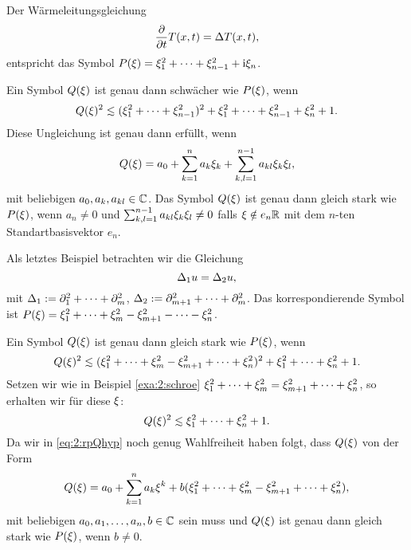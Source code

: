 \begin{exa}\label{exa:2:heat}
Der Wärmeleitungsgleichung
\begin{equation}
\frac{\partial}{\partial t}T(x,t)=\Delta T(x,t),
\end{equation}
entspricht das Symbol $P(\xi)=\xi^2_1+\dots+\xi^2_{n-1}+\mathrm i\xi_n$.

Ein Symbol $Q(\xi)$ ist genau dann schwächer wie $P(\xi)$, wenn
\begin{equation}
Q(\x)^2\apprle(\x^2_1+\dots+\x^2_{n-1})^2+\x^2_1+\dots+\x^2_{n-1}+\x^2_n+1.
\end{equation}
Diese Ungleichung ist genau dann erfüllt, wenn
\begin{equation}
Q(\xi)=a_0+\sum_{k=1}^na_k\xi_k+\sum_{k,l=1}^{n-1}a_{kl}\xi_k\xi_l,
\end{equation}
mit beliebigen $a_0,a_k,a_{kl}\in\mathbb C$.
Das Symbol $Q(\xi)$ ist genau dann gleich stark wie $P(\xi)$,
wenn $a_n\neq0$ und $\sum_{k,l=1}^{n-1}a_{kl}\xi_k\xi_l\neq0$ falls $\xi\notin e_n\mathbb R$
mit dem $n$-ten Standartbasisvektor $e_n$.
\end{exa}

\begin{exa}\label{exa:2:hyper}
Als letztes Beispiel betrachten wir die Gleichung
\begin{equation}
\Delta_1u=\Delta_2u,
\end{equation}
mit $\Delta_1:=\partial_1^2+\dots+\partial_m^2$, $\Delta_2:=\partial^2_{m+1}+\dots+\partial^2_m$.
Das korrespondierende Symbol ist $P(\xi)=\xi^2_1+\dots+\xi^2_m-\xi^2_{m+1}-\dots-\xi^2_n$.

Ein Symbol $Q(\xi)$ ist genau dann gleich stark wie $P(\xi)$,
wenn
\begin{equation}
Q(\x)^2\apprle(\x^2_1+\dots+\x^2_m-\x^2_{m+1}+\dots+\x^2_n)^2+\x^2_1+\dots+\x^2_n+1.
\end{equation}
Setzen wir wie in Beispiel \ref{exa:2:schroe} $\xi^2_1+\dots+\xi^2_m=\xi^2_{m+1}+\dots+\xi^2_n$,
so erhalten wir für diese $\xi$:
\begin{equation}\label{eq:2:rpQhyp}
Q(\x)^2\apprle\x^2_1+\dots+\x^2_n+1.
\end{equation}
Da wir in \eqref{eq:2:rpQhyp} noch genug Wahlfreiheit haben folgt,
dass $Q(\xi)$ von der Form
\begin{equation}
Q(\xi)=a_0+\sum_{k=1}^na_k\xi^k+b(\xi_1^2+\dots+\xi^2_m-\xi^2_{m+1}+\dots+\xi^2_n),
\end{equation}
mit beliebigen $a_0,a_1,\dots,a_n,b\in\mathbb C$ sein muss
und $Q(\xi)$ ist genau dann gleich stark wie $P(\xi)$,
wenn $b\neq0$.
\end{exa}

